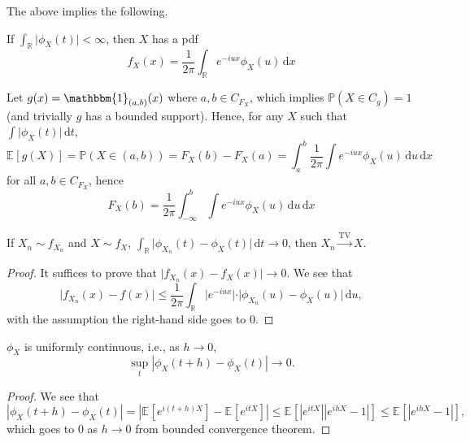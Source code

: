 The above implies the following.

\begin{theorem}\label{thm:pdf-characteristic-function}
	If \(\int _\mathbb{R} \vert \phi _X(t) \vert < \infty \), then \(X\) has a pdf
	\[
		f_X(x) = \frac{1}{2\pi } \int _\mathbb{R} e^{-iux} \phi _X(u) \,\mathrm{d} x
	\]
\end{theorem}

\begin{eg}
	Let \(g(x) = \mathbbm{1}_{(a, b)} (x) \) where \(a, b \in C_{F_X}\), which implies \(\mathbb{P} (X \in C_g) = 1\) (and trivially \(g\) has a bounded support). Hence, for any \(X\) such that \(\int \vert \phi _X(t) \vert \,\mathrm{d} t\),
	\[
		\mathbb{E}_{}[g(X)]
		= \mathbb{P} (X \in (a, b))
		= F_X(b) - F_X(a)
		= \int_{a}^{b} \frac{1}{2\pi } \int e^{-iux} \phi _X(u) \,\mathrm{d}u \,\mathrm{d} x
	\]
	for all \(a, b\in C_{F_X}\), hence
	\[
		F_X(b)
		= \frac{1}{2\pi } \int_{-\infty }^{b} \int e^{-iux} \phi _X(u) \,\mathrm{d}u \,\mathrm{d} x
	\]
\end{eg}

\begin{corollary}
	If \(X_n \sim f_{X_n}\) and \(X \sim f_X\), \(\int _\mathbb{R} \vert \phi _{X_n}(t) - \phi _X (t) \vert \,\mathrm{d} t \to 0\), then \(X_n \overset{\operatorname{TV} }{\to } X\).
\end{corollary}
\begin{proof}
	It suffices to prove that \(\vert f_{X_n}(x) - f_X(x) \vert \to 0\). We see that
	\[
		\vert f_{X_n}(x) - f(x) \vert
		\leq \frac{1}{2\pi } \int _{\mathbb{R} } \vert e^{-iux} \vert \cdot \vert \phi _{X_n}(u) - \phi _X(u) \vert \,\mathrm{d} u,
	\]
	with the assumption the right-hand side goes to \(0\).
\end{proof}



\begin{proposition}
	\(\phi _X\) is uniformly continuous, i.e., as \(h \to 0\),
	\[
		\sup _t \left\vert \phi _X(t + h) - \phi _X(t) \right\vert \to 0.
	\]
\end{proposition}
\begin{proof}
	We see that
	\[
		\left\vert \phi _{X}(t + h) - \phi _X(t) \right\vert
		= \left\vert \mathbb{E}_{}[e^{i(t + h)X}] - \mathbb{E}_{}[e^{itX}] \right\vert
		\leq \mathbb{E}_{}\left[ \left\vert e^{itX} \right\vert \left\vert e^{ihX} - 1 \right\vert \right]
		\leq \mathbb{E}_{}\left[ \left\vert e^{ihX} - 1 \right\vert \right],
	\]
	which goes to \(0\) as \(h \to 0\) from bounded convergence theorem.
\end{proof}

